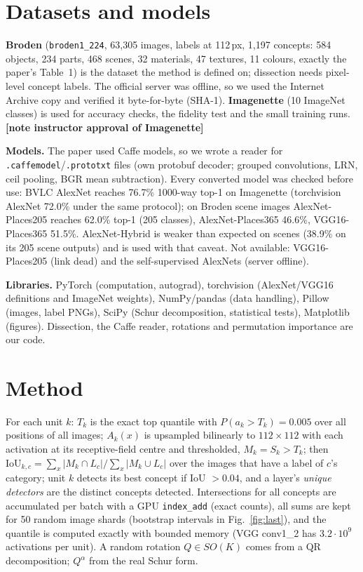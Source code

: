 \documentclass[10pt,a4paper]{article}
\newcommand{\fillin}[1]{\colorbox{yellow!40}{\textbf{[#1]}}}
\begin{document}
\section{Datasets and models}
\textbf{Broden} (\texttt{broden1\_224}, 63{,}305 images, labels at 112\,px, 1{,}197 concepts: 584 objects, 234 parts,
468 scenes, 32 materials, 47 textures, 11 colours, exactly the paper's Table~1) is the dataset the method is defined on;
dissection needs pixel-level concept labels. The official server was offline, so we used the Internet Archive copy and
verified it byte-for-byte (SHA-1). \textbf{Imagenette} (10 ImageNet classes) is used for accuracy checks, the fidelity test
and the small training runs. \fillin{note instructor approval of Imagenette}

\textbf{Models.} The paper used Caffe models, so we wrote a reader for \texttt{.caffemodel}/\texttt{.prototxt} files
(own protobuf decoder; grouped convolutions, LRN, ceil pooling, BGR mean subtraction). Every converted model was checked
before use: BVLC AlexNet reaches 76.7\% 1000-way top-1 on Imagenette (torchvision AlexNet 72.0\% under the same
protocol); on Broden scene images AlexNet-Places205 reaches 62.0\% top-1 (205 classes), AlexNet-Places365 46.6\%,
VGG16-Places365 51.5\%. AlexNet-Hybrid is weaker than expected on scenes (38.9\% on its 205 scene outputs) and is used with
that caveat. Not available: VGG16-Places205 (link dead) and the self-supervised AlexNets (server offline).

\textbf{Libraries.} PyTorch (computation, autograd), torchvision (AlexNet/VGG16 definitions and ImageNet weights),
NumPy/pandas (data handling), Pillow (images, label PNGs), SciPy (Schur decomposition, statistical tests), Matplotlib
(figures). Dissection, the Caffe reader, rotations and permutation importance are our code.

\section{Method}
For each unit $k$: $T_k$ is the exact top quantile with $P(a_k>T_k)=0.005$ over all positions of all images;
$A_k(x)$ is upsampled bilinearly to $112\times112$ with each activation at its receptive-field centre and thresholded,
$M_k=S_k>T_k$; then $\mathrm{IoU}_{k,c}=\sum_x|M_k\cap L_c|/\sum_x|M_k\cup L_c|$ over the images that have a label of
$c$'s category; unit $k$ detects its best concept if IoU $>0.04$, and a layer's \emph{unique detectors} are the distinct
concepts detected. Intersections for all concepts are accumulated per batch with a GPU \texttt{index\_add} (exact counts),
all sums are kept for 50 random image shards (bootstrap intervals in Fig.~\ref{fig:last}), and the quantile is computed exactly
with bounded memory (VGG conv1\_2 has $3.2\cdot10^9$ activations per unit). A random rotation $Q\in SO(K)$ comes from a QR
decomposition; $Q^\alpha$ from the real Schur form.
\end{document}
